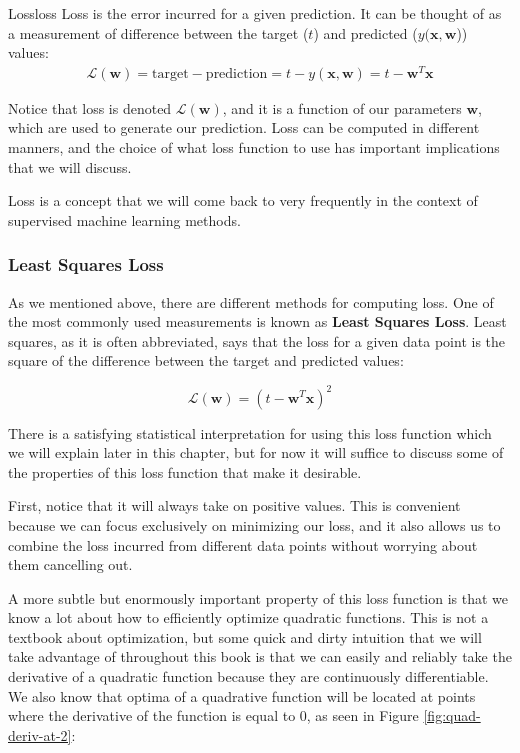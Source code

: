 \begin{definition}{Loss}{loss}
Loss is the error incurred for a given prediction. It can be thought of as a measurement of difference between the target ($t$) and predicted ($y(\textbf{x}, \textbf{w}$)) values:
\begin{align*}
    \mathcal{L}(\textbf{w}) = \text{target} - \text{prediction} = t - y(\textbf{x}, \textbf{w}) = \boxed{t - \textbf{w}^{T}\textbf{x}}
\end{align*}

Notice that loss is denoted $\mathcal{L}(\textbf{w})$, and it is a function of our parameters $\textbf{w}$, which are used to generate our prediction. Loss can be computed in different manners, and the choice of what loss function to use has important implications that we will discuss.
\end{definition}

Loss is a concept that we will come back to very frequently in the context of supervised machine learning methods.

\subsubsection{Least Squares Loss}
As we mentioned above, there are different methods for computing loss. One of the most commonly used measurements is known as \textbf{Least Squares Loss}. Least squares, as it is often abbreviated, says that the loss for a given data point is the square of the difference between the target and predicted values:

\begin{equation} \label{least-squares-loss-fn}
    \mathcal{L}(\textbf{w}) = (t - \textbf{w}^{T}\textbf{x})^2
\end{equation}

There is a satisfying statistical interpretation for using this loss function which we will explain later in this chapter, but for now it will suffice to discuss some of the properties of this loss function that make it desirable.

First, notice that it will always take on positive values. This is convenient because we can focus exclusively on minimizing our loss, and it also allows us to combine the loss incurred from different data points without worrying about them cancelling out.

A more subtle but enormously important property of this loss function is that we know a lot about how to efficiently optimize quadratic functions. This is not a textbook about optimization, but some quick and dirty intuition that we will take advantage of throughout this book is that we can easily and reliably take the derivative of a quadratic function because they are continuously differentiable. We also know that optima of a quadrative function will be located at points where the derivative of the function is equal to 0, as seen in Figure \ref{fig:quad-deriv-at-2}:

